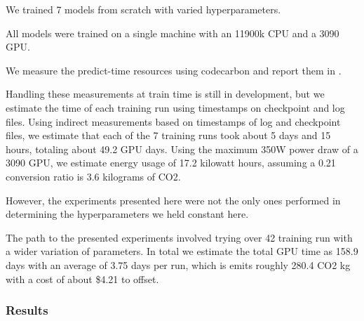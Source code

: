\documentclass[10pt,twocolumn,letterpaper]{article}
\begin{document}
We trained 7 models from scratch with varied hyperparameters.

All models were trained on a single machine with an 11900k CPU and a 3090 GPU.

We measure the predict-time resources using codecarbon \cite{lacoste2019codecarbon} and report them in 
.


Handling these measurements at train time is still in development, but we
estimate the time of each training run using timestamps on checkpoint and log
files.  Using indirect measurements based on timestamps of log and checkpoint
files, we estimate that each of the 7 training runs took about 5 days and 15
hours, totaling about 49.2 GPU days. Using the maximum 350W power draw of a
3090 GPU, we estimate energy usage of 17.2 kilowatt hours, assuming a 0.21
conversion ratio is 3.6 kilograms of CO2.


However, the experiments presented here were not the only ones performed in
determining the hyperparameters we held constant here. 

The path to the presented experiments involved trying over 42 training run with
a wider variation of parameters. In total we estimate the total GPU time as
158.9 days with an average of 3.75 days per run, which is emits roughly 280.4
CO2 kg with a cost of about \$4.21 to offset.

\subsubsection{Results}

\end{document}
